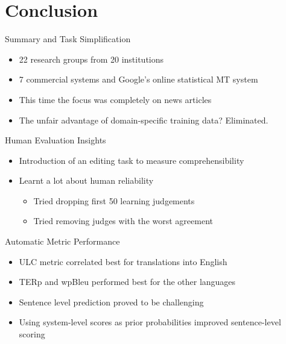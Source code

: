 \section{Conclusion}

\begin{frame}{Summary and Task Simplification}
\begin{itemize}
    \item 22 research groups from 20 institutions
    \item 7 commercial systems and Google's online statistical MT system
    \item This time the focus was completely on news articles
    \item The unfair advantage of domain-specific training data? Eliminated.
\end{itemize}
\end{frame}

\begin{frame}{Human Evaluation Insights}
\begin{itemize}
    \item Introduction of an editing task to measure comprehensibility
    \item Learnt a lot about human reliability
    \begin{itemize}
        \item Tried dropping first 50 learning judgements
        \item Tried removing judges with the worst agreement
    \end{itemize}
\end{itemize}
\end{frame}

\begin{frame}{Automatic Metric Performance}
\begin{itemize}
    \item ULC metric correlated best for translations into English
    \item TERp and wpBleu performed best for the other languages
    \item Sentence level prediction proved to be challenging
    \item Using system-level scores as prior probabilities improved sentence-level scoring
\end{itemize}
\end{frame}
